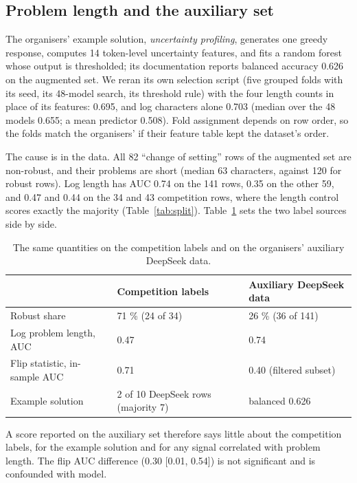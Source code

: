 \documentclass{article}
\begin{document}
\subsection{Problem length and the auxiliary set}

The organisers' example solution, \emph{uncertainty profiling}, generates one greedy response, computes 14 token-level uncertainty features, and fits a random forest whose output is thresholded; its documentation reports balanced accuracy 0.626 on the augmented set. We reran its own selection script (five grouped folds with its seed, its 48-model search, its threshold rule) with the four length counts in place of its features: 0.695, and log characters alone 0.703 (median over the 48 models 0.655; a mean predictor 0.508). Fold assignment depends on row order, so the folds match the organisers' if their feature table kept the dataset's order.

The cause is in the data. All 82 ``change of setting'' rows of the augmented set are non-robust, and their problems are short (median 63 characters, against 120 for robust rows). Log length has AUC 0.74 on the 141 rows, 0.35 on the other 59, and 0.47 and 0.44 on the 34 and 43 competition rows, where the length control scores exactly the majority (Table~\ref{tab:split}). Table~\ref{tab:sources} sets the two label sources side by side.

\begin{table}[h]
\centering
\small
\caption{The same quantities on the competition labels and on the organisers' auxiliary DeepSeek data.}\label{tab:sources}
\begin{tabular}{@{}p{5.6cm}p{3.2cm}p{3.6cm}@{}}
\toprule
 & Competition labels & Auxiliary DeepSeek data \\
\midrule
Robust share & 71 \% (24 of 34) & 26 \% (36 of 141) \\
Log problem length, AUC & 0.47 & 0.74 \\
Flip statistic, in-sample AUC & 0.71 & 0.40 (filtered subset) \\
Example solution & 2 of 10 DeepSeek rows (majority 7) & balanced 0.626 \\
\bottomrule
\end{tabular}
\end{table}

A score reported on the auxiliary set therefore says little about the competition labels, for the example solution and for any signal correlated with problem length. The flip AUC difference (0.30 {[}\textminus{}0.01, 0.54{]}) is not significant and is confounded with model.
\end{document}
